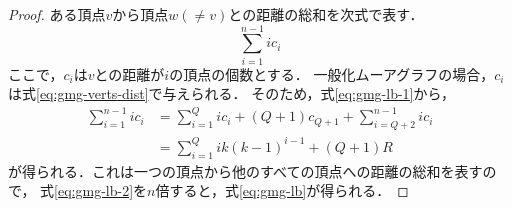 \begin{proof}
  ある頂点$v$から頂点$w(\neq v)$との距離の総和を次式で表す．
  \begin{equation}
    \label{eq:gmg-lb-1}
    \sum_{i=1}^{n-1}i c_i
  \end{equation}
  ここで，$c_i$は$v$との距離が$i$の頂点の個数とする．
  一般化ムーアグラフの場合，$c_i$は式\ref{eq:gmg-verts-dist}で与えられる．
  そのため，式\ref{eq:gmg-lb-1}から，
  \begin{align}
      \sum_{i=1}^{n-1}ic_i
      &=\sum_{i=1}^{Q}ic_i+(Q+1)c_{Q+1}+\sum_{i=Q+2}^{n-1}ic_i \nonumber\\
      &=\sum_{i=1}^{Q}ik(k-1)^{i-1}+(Q+1)R
      \label{eq:gmg-lb-2}
  \end{align}
  が得られる．これは一つの頂点から他のすべての頂点への距離の総和を表すので，
  式\ref{eq:gmg-lb-2}を$n$倍すると，式\ref{eq:gmg-lb}が得られる．


\end{proof}
